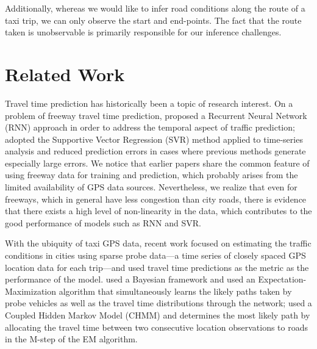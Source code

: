 \documentclass{article}
\begin{document}
Additionally, whereas we would like to infer road conditions along the route of
a taxi trip, we can only observe the start and end-points. The fact that the
route taken is unobservable is primarily responsible for our inference
challenges.


\section{Related Work}


Travel time prediction has historically been a topic of research interest. On a problem of freeway travel time prediction, \citet*{van2002freeway} proposed a Recurrent Neural Network (RNN) approach in order to address the temporal aspect of traffic prediction; \citet*{wu2004travel} adopted the Supportive Vector Regression (SVR) method applied to time-series analysis and reduced prediction errors in cases where previous methods generate especially large errors. We notice that earlier papers share the common feature of using freeway data for training and prediction, which probably arises from the limited availability of GPS data sources. Nevertheless, we realize that even for freeways, which in general have less congestion than city roads, there is evidence that there exists a high level of non-linearity in the data, which contributes to the good performance of models such as RNN and SVR.

With the ubiquity of taxi GPS data, recent work focused on estimating the traffic conditions in cities using sparse probe data---a time series of closely spaced GPS location data for each trip---and used travel time predictions as the metric as the performance of the model. \citet*{hunter2009path} used a Bayesian framework and used an Expectation-Maximization algorithm that simultaneously learns the likely paths taken by probe vehicles as well as the travel time distributions through the network; \citet*{herring2010estimating} used a Coupled Hidden Markov Model (CHMM) and determines the most likely path by allocating the travel time between two consecutive location observations to roads in the M-step of the EM algorithm.
\end{document}
